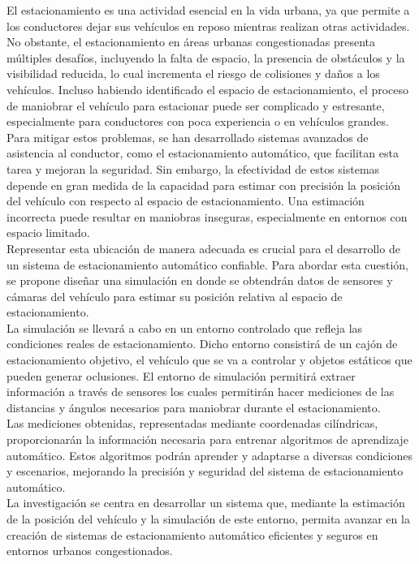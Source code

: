 \noindent
El estacionamiento es una actividad esencial en la vida urbana, ya que permite a los conductores dejar sus vehículos en reposo mientras realizan otras actividades.
No obstante, el estacionamiento en áreas urbanas congestionadas presenta múltiples desafíos, incluyendo la falta de espacio,
la presencia de obstáculos y la visibilidad reducida, lo cual incrementa el riesgo de colisiones y daños a los vehículos.
Incluso habiendo identificado el espacio de estacionamiento, el proceso de maniobrar el vehículo para estacionar puede ser complicado y estresante,
especialmente para conductores con poca experiencia o en vehículos grandes.\\
\noindent
Para mitigar estos problemas, se han desarrollado sistemas avanzados de asistencia al conductor, como el estacionamiento automático,
que facilitan esta tarea y mejoran la seguridad.
Sin embargo, la efectividad de estos sistemas depende en gran medida de la capacidad para estimar con precisión la posición del vehículo
con respecto al espacio de estacionamiento.
Una estimación incorrecta puede resultar en maniobras inseguras, especialmente en entornos con espacio limitado.\\
\noindent
Representar esta ubicación de manera adecuada es crucial para el desarrollo de un sistema de estacionamiento automático confiable.
Para abordar esta cuestión, se propone diseñar una simulación en donde se obtendrán datos de sensores
y cámaras del vehículo para estimar su posición relativa al espacio de estacionamiento.\\
\noindent
La simulación se llevará a cabo en un entorno controlado que refleja las condiciones reales de estacionamiento.
Dicho entorno consistirá de un cajón de estacionamiento objetivo, el vehículo que se va a controlar y objetos estáticos que pueden generar oclusiones.
El entorno de simulación permitirá extraer información a través de sensores los cuales permitirán hacer mediciones de las distancias y ángulos necesarios para maniobrar durante el estacionamiento.\\
\noindent
Las mediciones obtenidas, representadas mediante coordenadas cilíndricas, proporcionarán la información necesaria para entrenar algoritmos de aprendizaje automático.
Estos algoritmos podrán aprender y adaptarse a diversas condiciones y escenarios, mejorando la precisión y seguridad del sistema de estacionamiento automático.\\
\noindent
La investigación se centra en desarrollar un sistema que, mediante la estimación de la posición del vehículo y la simulación de este entorno, permita avanzar en la creación de sistemas de estacionamiento automático eficientes y seguros en entornos urbanos congestionados.